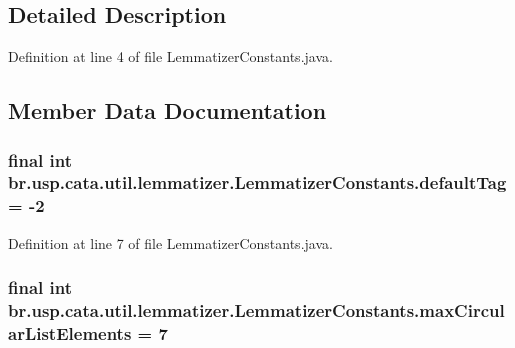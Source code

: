 \subsection{Detailed Description}


Definition at line 4 of file Lemmatizer\+Constants.\+java.



\subsection{Member Data Documentation}
\hypertarget{classbr_1_1usp_1_1cata_1_1util_1_1lemmatizer_1_1_lemmatizer_constants_ae04f3a5a4c22fa5d035f5cac2c8cc95f}{
\subsubsection[{default\+Tag}]{\setlength{\rightskip}{0pt plus 5cm}final int br.\+usp.\+cata.\+util.\+lemmatizer.\+Lemmatizer\+Constants.\+default\+Tag = -\/2\hspace{0.3cm}{\ttfamily [static]}}}\label{classbr_1_1usp_1_1cata_1_1util_1_1lemmatizer_1_1_lemmatizer_constants_ae04f3a5a4c22fa5d035f5cac2c8cc95f}


Definition at line 7 of file Lemmatizer\+Constants.\+java.

\hypertarget{classbr_1_1usp_1_1cata_1_1util_1_1lemmatizer_1_1_lemmatizer_constants_a4283074f73595a42746d6a19a5aa882b}{
\subsubsection[{max\+Circular\+List\+Elements}]{\setlength{\rightskip}{0pt plus 5cm}final int br.\+usp.\+cata.\+util.\+lemmatizer.\+Lemmatizer\+Constants.\+max\+Circular\+List\+Elements = 7\hspace{0.3cm}{\ttfamily [static]}}}\label{classbr_1_1usp_1_1cata_1_1util_1_1lemmatizer_1_1_lemmatizer_constants_a4283074f73595a42746d6a19a5aa882b}


